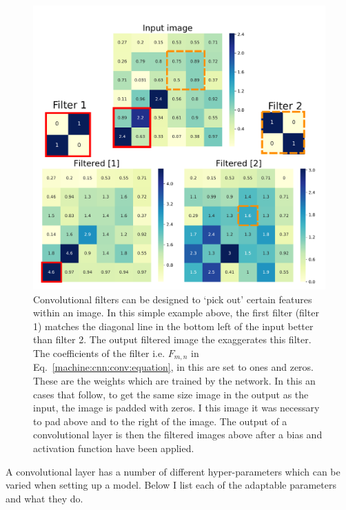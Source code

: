 \begin{figure}[p]

    \centering
    \includegraphics[width=\columnwidth]{C4_cnn/conv_filters.pdf}
    \caption[How convolutions are applied in convolutional neural networks.]{Convolutional filters can be designed to `pick out' certain features within an image. In this simple example above, the first filter (filter 1) matches the diagonal line in the bottom left of the input better than filter 2. The output filtered image the exaggerates this filter. The coefficients of the filter i.e. $F_{m,n}$ in Eq.~\ref{machine:cnn:conv:equation}, in this are set to ones and zeros.
    These are the weights which are trained by the network. In this an cases that follow, to get the same size image in the output as the input, the image is padded with zeros. I this image it was necessary to pad above and to the right of the image. The output of a convolutional layer is then the filtered images above after a bias and activation function have been applied. }
    \label{machine:cnn:convlayer:input}

\end{figure}

A convolutional layer has a number of different hyper-parameters which can be varied when setting up a model.
Below I list each of the adaptable parameters and what they do.

